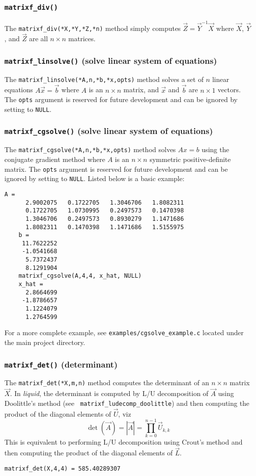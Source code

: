 \subsubsection{{\tt matrixf\_div()}}
\label{module:matrix:div}
The {\tt matrixf\_div(*X,*Y,*Z,*n)} method simply computes
$\vec{Z} = \vec{Y}^{-1}\vec{X}$
where $\vec{X}$, $\vec{Y}$, and $\vec{Z}$ are all $n \times n$ matrices.


\subsubsection{{\tt matrixf\_linsolve()} (solve linear system of equations)}
\label{module:matrix:linsolve}
The {\tt matrixf\_linsolve(*A,n,*b,*x,opts)} method solves a set of $n$ linear
equations $A\vec{x} = \vec{b}$
where
$A$ is an $n \times n$ matrix, and
$\vec{x}$ and $\vec{b}$ are $n \times 1$ vectors.
The {\tt opts} argument is reserved for future development and can be
ignored by setting to {\tt NULL}.

\subsubsection{{\tt matrixf\_cgsolve()} (solve linear system of equations)}
\label{module:matrix:cgsolve}
The {\tt matrixf\_cgsolve(*A,n,*b,*x,opts)} method solves $Ax = b$
using the conjugate gradient method
where $A$ is an $n \times n$ symmetric positive-definite matrix.
The {\tt opts} argument is reserved for future development and can be
ignored by setting to {\tt NULL}.
%
Listed below is a basic example:
%
\begin{Verbatim}[fontsize=\small]
    A = 
      2.9002075   0.1722705   1.3046706   1.8082311
      0.1722705   1.0730995   0.2497573   0.1470398
      1.3046706   0.2497573   0.8930279   1.1471686
      1.8082311   0.1470398   1.1471686   1.5155975
    b =
     11.7622252
     -1.0541668
      5.7372437
      8.1291904
    matrixf_cgsolve(A,4,4, x_hat, NULL)
    x_hat =
      2.8664699
     -1.8786657
      1.1224079
      1.2764599
\end{Verbatim}
%
For a more complete example, see {\tt examples/cgsolve\_example.c}
located under the main project directory.

\subsubsection{{\tt matrixf\_det()} (determinant)}
\label{module:matrix:det}
The {\tt matrixf\_det(*X,m,n)} method computes the determinant
of an $n \times n$ matrix $\vec{X}$.
In {\it liquid}, the determinant is computed by L/U decomposition of
$\vec{A}$ using Doolittle's method (see {\tt
matrixf\_ludecomp\_doolittle}) and then computing the product of the
diagonal elements of $\vec{U}$, viz
\[
    \det\left(\vec{A}\right) =
    \left|\vec{A}\right| =
    \prod_{k=0}^{n-1}{\vec{U}_{k,k}}
\]
This is equivalent to performing L/U decomposition using Crout's method and
then computing the product of the diagonal elements of $\vec{L}$.
%
\begin{Verbatim}[fontsize=\small]
    matrixf_det(X,4,4) = 585.40289307
\end{Verbatim}

